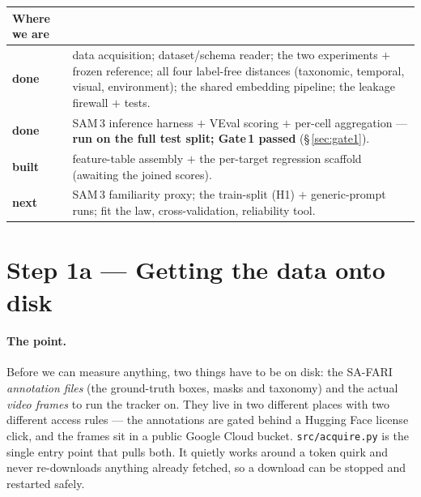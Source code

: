 \documentclass[11pt,a4paper]{article}
\newcommand{\done}{{\color{forest}\textbf{done}}}
\newcommand{\built}{{\color{navy}\textbf{built}}}
\newcommand{\todo}{{\color{burnt}\textbf{next}}}
\newcommand{\code}[1]{\texttt{#1}}
\begin{document}
\vspace{-0.4em}
\begin{center}\small
\begin{tabular}{@{}lp{11.4cm}@{}}
\toprule
\textbf{Where we are} & \\
\midrule
\done   & data acquisition; dataset/schema reader; the two experiments $+$ frozen reference; all four
          label-free distances (taxonomic, temporal, visual, environment); the shared embedding pipeline;
          the leakage firewall $+$ tests.\\
\done   & SAM\,3 inference harness $+$ VEval scoring $+$ per-cell aggregation --- \textbf{run on the full
          test split; Gate\,1 passed} (\S\,\ref{sec:gate1}).\\
\built  & feature-table assembly $+$ the per-target regression scaffold (awaiting the joined scores).\\
\todo   & SAM\,3 familiarity proxy; the train-split (H1) $+$ generic-prompt runs; fit the law,
          cross-validation, reliability tool.\\
\bottomrule
\end{tabular}
\end{center}

\section{Step 1a --- Getting the data onto disk}

\paragraph{The point.}
Before we can measure anything, two things have to be on disk: the SA-FARI \emph{annotation files} (the
ground-truth boxes, masks and taxonomy) and the actual \emph{video frames} to run the tracker on. They live
in two different places with two different access rules --- the annotations are gated behind a Hugging Face
license click, and the frames sit in a public Google Cloud bucket. \code{src/acquire.py} is the single
entry point that pulls both. It quietly works around a token quirk and never re-downloads anything already
fetched, so a download can be stopped and restarted safely.
\end{document}
